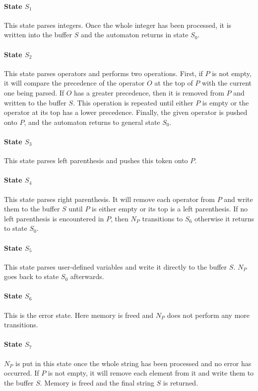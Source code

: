\documentclass[a4paper,11pt,titlepage]{article}
\begin{document}
\paragraph{State $S_1$} This state parses integers. Once the whole integer has been processed, it is written into the buffer $S$ and the automaton returns in state $S_0$.

\paragraph{State $S_2$} This state parses operators and performs two operations. First, if $P$ is not empty, it will compare the precedence of the operator $O$ at the top of $P$ with the current one being parsed. If $O$ has a greater precedence, then it is removed from $P$ and written to the buffer $S$. This operation is repeated until either $P$ is empty or the operator at its top has a lower precedence. Finally, the given operator is pushed onto $P$, and the automaton returns to general state $S_0$.

\paragraph{State $S_3$} This state parses left parenthesis and pushes this token onto $P$.

\paragraph{State $S_4$} This state parses right parenthesis. It will remove each operator from $P$ and write them to the buffer $S$ until $P$ is either empty or its top is a left parenthesis. If no left parenthesis is encountered in $P$, then $N_P$ transitions to $S_6$ otherwise it returns to state $S_0$.

\paragraph{State $S_5$} This state parses user-defined variables and write it directly to the buffer $S$. $N_P$ goes back to state $S_0$ afterwards.

\paragraph{State $S_6$} This is the error state. Here memory is freed and $N_P$ does not perform any more transitions.

\paragraph{State $S_7$} $N_P$ is put in this state once the whole string has been processed and no error has occurred. If $P$ is not empty, it will remove each element from it and write them to the buffer $S$. Memory is freed and the final string $S$ is returned. 
\end{document}

